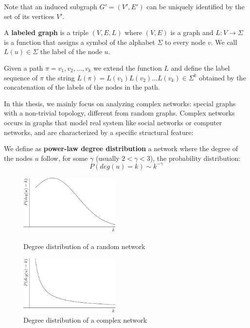 Note that an induced subgraph $G' = (V', E')$ can be uniquely identified by the set of its vertices $V'$.

\begin{definizione}\label{def:labeledgraph}
	A \textbf{labeled graph} is a triple $(V,E,L)$ where $(V,E)$ is a graph and $L : V \rightarrow \Sigma$
	is a function that assigns a symbol of the alphabet $\Sigma$ to every node $v$. We call $L(u) \in \Sigma$ the label of the node $u$.
\end{definizione}

Given a path $\pi = v_{1}, v_{2}, \ldots, v_{k}$ we extend the function $L$ and define the label sequence of $\pi$ the string $L(\pi) = L(v_{1}) L(v_{2}) \ldots L(v_{k}) \in \Sigma^{k}$ obtained by the concatenation of the labels of the nodes in the path.\medskip

In this thesis, we mainly focus on analyzing complex networks: special graphs with a non-trivial topology, different from random graphs. Complex networks occurs in graphs that model real system like social networks or computer networks, and are characterized by a specific structural feature:

\begin{definizione}\label{def:power-law-graph}
	We define as \textbf{power-law degree distribution} a network where the degree of the nodes $u$ follow, for some $\gamma$ (usually $2 < \gamma < 3$), the probability distribution:
	\begin{equation}
	P(deg(u) = k) \sim k^{-\gamma}  
	\end{equation}
\end{definizione}

\begin{figure}[h]
	\centering
	\begin{minipage}[t]{.45\textwidth}
		\centering
		\includegraphics[width=5cm,height=3cm]{figure/figure-1-1}
		\caption{Degree distribution of a random network}
	\end{minipage}\hfill
	\begin{minipage}[t]{.45\textwidth}
		\centering 
		\includegraphics[width=5cm,height=3cm]{figure/figure-1-2}
		\caption{Degree distribution of a complex network}
	\end{minipage}
\end{figure}

